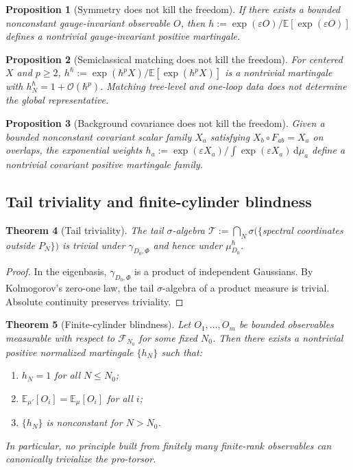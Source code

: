 \documentclass[12pt,a4paper]{article}
\theoremstyle{plain}
\newtheorem{theorem}{Theorem}[section]
\newtheorem{proposition}[theorem]{Proposition}
\theoremstyle{definition}
\theoremstyle{remark}
\newcommand{\dd}{\mathrm{d}}
\newcommand{\cF}{\mathcal{F}}
\newcommand{\E}{\mathbb{E}}
\newcommand{\order}{\mathcal{O}}
\begin{document}
\begin{proposition}[Symmetry does not kill the freedom]
\label{prop:symmetry-nogo}
If there exists a bounded nonconstant gauge-invariant observable $O$,
then $h := \exp(\varepsilon O)/\E[\exp(\varepsilon O)]$ defines a
nontrivial gauge-invariant positive martingale.
\end{proposition}

\begin{proposition}[Semiclassical matching does not kill the freedom]
\label{prop:semiclassical-nogo}
For centered $X$ and $p \ge 2$, $h^\hbar := \exp(\hbar^p X)/
\E[\exp(\hbar^p X)]$ is a nontrivial martingale with
$h_N^\hbar = 1 + \order(\hbar^p)$.  Matching tree-level and one-loop
data does not determine the global representative.
\end{proposition}

\begin{proposition}[Background covariance does not kill the freedom]
\label{prop:bg-nogo}
Given a bounded nonconstant covariant scalar family $X_a$ satisfying
$X_b \circ F_{ab} = X_a$ on overlaps, the exponential weights
$h_a := \exp(\varepsilon X_a)/\int\exp(\varepsilon X_a)\,\dd\mu_a$
define a nontrivial covariant positive martingale family.
\end{proposition}

\subsection{Tail triviality and finite-cylinder blindness}

\begin{theorem}[Tail triviality]
\label{thm:tail}
The tail $\sigma$-algebra
$\mathcal{T} := \bigcap_N \sigma(\{$spectral coordinates outside
$P_N\})$ is trivial under $\gamma_{D_0,\Phi}$ and hence under
$\mu_{D_0}^\hbar$.
\end{theorem}

\begin{proof}
In the eigenbasis, $\gamma_{D_0,\Phi}$ is a product of independent
Gaussians.  By Kolmogorov's zero-one law, the tail $\sigma$-algebra
of a product measure is trivial.  Absolute continuity preserves
triviality.
\end{proof}

\begin{theorem}[Finite-cylinder blindness]
\label{thm:blindness}
Let $O_1, \ldots, O_m$ be bounded observables measurable with respect
to $\cF_{N_0}$ for some fixed $N_0$.  Then there exists a nontrivial
positive normalized martingale $\{h_N\}$ such that:
\begin{enumerate}[label=\textup{(\roman*)},leftmargin=2.5em]
  \item $h_N = 1$ for all $N \le N_0$;
  \item $\E_{\mu'}[O_i] = \E_\mu[O_i]$ for all $i$;
  \item $\{h_N\}$ is nonconstant for $N > N_0$.
\end{enumerate}
In particular, no principle built from finitely many finite-rank
observables can canonically trivialize the pro-torsor.
\end{theorem}
\end{document}
